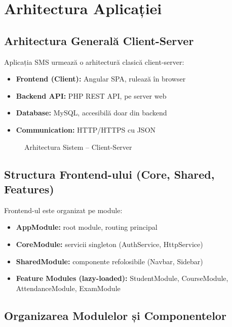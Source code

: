\chapter{Arhitectura Aplicației}
\label{cap:arhitectura}

\section{Arhitectura Generală Client-Server}

Aplicația SMS urmează o arhitectură clasică client-server:

\begin{itemize}
  \item \textbf{Frontend (Client):} Angular SPA, rulează în browser
  \item \textbf{Backend API:} PHP REST API, pe server web
  \item \textbf{Database:} MySQL, accesibilă doar din backend
  \item \textbf{Communication:} HTTP/HTTPS cu JSON
\end{itemize}

\begin{figure}[H]
  \centering
  \caption{Arhitectura Sistem – Client-Server}
  \label{fig:arch}
\end{figure}

\section{Structura Frontend-ului (Core, Shared, Features)}

Frontend-ul este organizat pe module:

\begin{itemize}
  \item \textbf{AppModule:} root module, routing principal
  \item \textbf{CoreModule:} servicii singleton (AuthService, HttpService)
  \item \textbf{SharedModule:} componente refolosibile (Navbar, Sidebar)
  \item \textbf{Feature Modules (lazy-loaded):} StudentModule, CourseModule, AttendanceModule, ExamModule
\end{itemize}

\section{Organizarea Modulelor și Componentelor}

